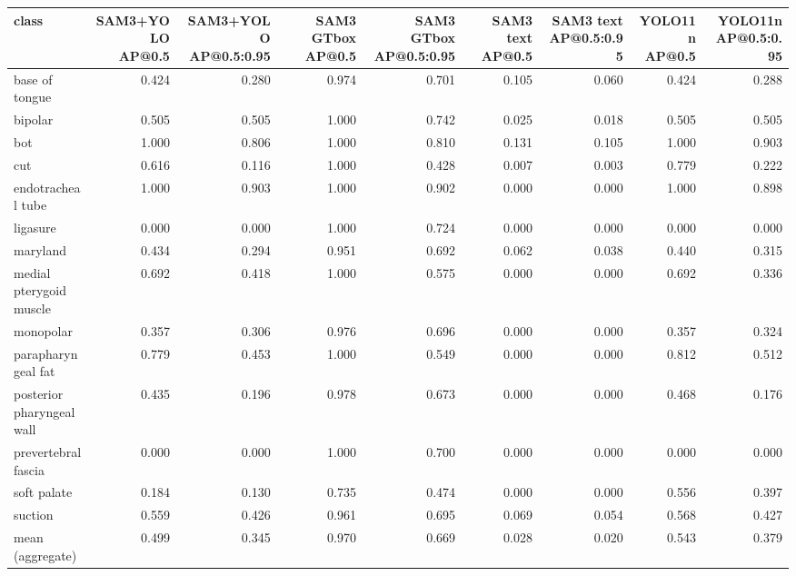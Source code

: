 \begin{tabular}{lrrrrrrrr}
\toprule
class & SAM3+YOLO AP@0.5 & SAM3+YOLO AP@0.5:0.95 & SAM3 GTbox AP@0.5 & SAM3 GTbox AP@0.5:0.95 & SAM3 text AP@0.5 & SAM3 text AP@0.5:0.95 & YOLO11n AP@0.5 & YOLO11n AP@0.5:0.95 \\
\midrule
base of tongue & 0.424 & 0.280 & 0.974 & 0.701 & 0.105 & 0.060 & 0.424 & 0.288 \\
bipolar & 0.505 & 0.505 & 1.000 & 0.742 & 0.025 & 0.018 & 0.505 & 0.505 \\
bot & 1.000 & 0.806 & 1.000 & 0.810 & 0.131 & 0.105 & 1.000 & 0.903 \\
cut & 0.616 & 0.116 & 1.000 & 0.428 & 0.007 & 0.003 & 0.779 & 0.222 \\
endotracheal tube & 1.000 & 0.903 & 1.000 & 0.902 & 0.000 & 0.000 & 1.000 & 0.898 \\
ligasure & 0.000 & 0.000 & 1.000 & 0.724 & 0.000 & 0.000 & 0.000 & 0.000 \\
maryland & 0.434 & 0.294 & 0.951 & 0.692 & 0.062 & 0.038 & 0.440 & 0.315 \\
medial pterygoid muscle & 0.692 & 0.418 & 1.000 & 0.575 & 0.000 & 0.000 & 0.692 & 0.336 \\
monopolar & 0.357 & 0.306 & 0.976 & 0.696 & 0.000 & 0.000 & 0.357 & 0.324 \\
parapharyngeal fat & 0.779 & 0.453 & 1.000 & 0.549 & 0.000 & 0.000 & 0.812 & 0.512 \\
posterior pharyngeal wall & 0.435 & 0.196 & 0.978 & 0.673 & 0.000 & 0.000 & 0.468 & 0.176 \\
prevertebral fascia & 0.000 & 0.000 & 1.000 & 0.700 & 0.000 & 0.000 & 0.000 & 0.000 \\
soft palate & 0.184 & 0.130 & 0.735 & 0.474 & 0.000 & 0.000 & 0.556 & 0.397 \\
suction & 0.559 & 0.426 & 0.961 & 0.695 & 0.069 & 0.054 & 0.568 & 0.427 \\
\midrule
mean (aggregate) & 0.499 & 0.345 & 0.970 & 0.669 & 0.028 & 0.020 & 0.543 & 0.379 \\
\bottomrule
\end{tabular}
